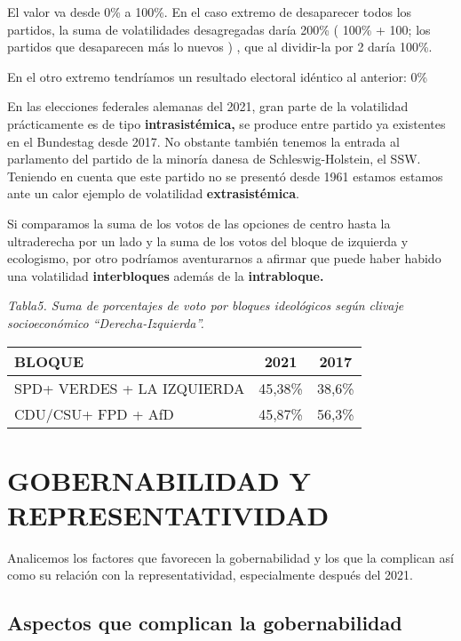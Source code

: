 \documentclass[
]{article}
\begin{document}
El valor va desde 0\% a 100\%. En el caso extremo de desaparecer todos
los partidos, la suma de volatilidades desagregadas daría 200\% ( 100\%
+ 100; los partidos que desaparecen más lo nuevos ) , que al dividir-la
por 2 daría 100\%.

En el otro extremo tendríamos un resultado electoral idéntico al
anterior: 0\%

En las elecciones federales alemanas del 2021, gran parte de la
volatilidad prácticamente es de tipo \textbf{intrasistémica,} se produce
entre partido ya existentes en el Bundestag desde 2017. No obstante
también tenemos la entrada al parlamento del partido de la minoría
danesa de Schleswig-Holstein, el SSW. Teniendo en cuenta que este
partido no se presentó desde 1961 estamos estamos ante un calor ejemplo
de volatilidad \textbf{extrasistémica}.

Si comparamos la suma de los votos de las opciones de centro hasta la
ultraderecha por un lado y la suma de los votos del bloque de izquierda
y ecologismo, por otro podríamos aventurarnos a afirmar que puede haber
habido una volatilidad \textbf{interbloques} además de la
\textbf{intrabloque.}

\emph{Tabla5. Suma de porcentajes de voto por bloques ideológicos según
clivaje socioeconómico ``Derecha-Izquierda''.}

\begin{longtable}[]{@{}lcc@{}}
\toprule\noalign{}
\textbf{BLOQUE} & \textbf{2021} & \textbf{2017} \\
\midrule\noalign{}
\endhead
\bottomrule\noalign{}
\endlastfoot
SPD+ VERDES + LA IZQUIERDA & 45,38\% & 38,6\% \\
CDU/CSU+ FPD + AfD & 45,87\% & 56,3\% \\
\end{longtable}

\hypertarget{gobernabilidad-y-representatividad}{%
\section{GOBERNABILIDAD Y
REPRESENTATIVIDAD}\label{gobernabilidad-y-representatividad}}

Analicemos los factores que favorecen la gobernabilidad y los que la
complican así como su relación con la representatividad, especialmente
después del 2021.

\hypertarget{aspectos-que-complican-la-gobernabilidad}{%
\subsection{Aspectos que complican la
gobernabilidad}\label{aspectos-que-complican-la-gobernabilidad}}
\end{document}
